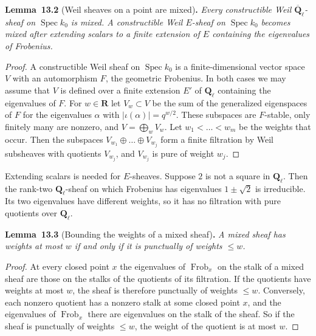 \documentclass[11pt]{article}
\newenvironment{bpstatement}[2]{\par\addvspace{0.6\baselineskip}\noindent\textbf{#1}#2\textbf{.}\enspace\ignorespaces}
  {\par\addvspace{0.4\baselineskip}}
\newenvironment{bpstatementit}[2]{\begin{bpstatement}{#1}{#2}\itshape\ignorespaces}{\end{bpstatement}}
\begin{document}
\label{bp9}%
\begin{bpstatementit}{Lemma~13.2}{ (Weil sheaves on a point are mixed)}
Every constructible Weil \(\overline{\mathbf Q}_\ell\)-sheaf on \(\operatorname{Spec}k_0\) is mixed. A constructible Weil \(E\)-sheaf on \(\operatorname{Spec}k_0\) becomes mixed after extending scalars to a finite extension of \(E\) containing the eigenvalues of Frobenius.
\end{bpstatementit}

\begin{proof}[{Proof}]\label{bp10}%
A constructible Weil sheaf on \(\operatorname{Spec}k_0\) is a finite-dimensional vector space \(V\) with an automorphism \(F\), the geometric Frobenius. In both cases we may assume that \(V\) is defined over a finite extension \(E'\) of \(\mathbf Q_\ell\) containing the eigenvalues of \(F\). For \(w\in\mathbf R\) let \(V_w\subset V\) be the sum of the generalized eigenspaces of \(F\) for the eigenvalues \(\alpha\) with \(|\iota(\alpha)|=q^{w/2}\). These subspaces are \(F\)-stable, only finitely many are nonzero, and \(V=\bigoplus_wV_w\). Let \(w_1<\dots<w_m\) be the weights that occur. Then the subspaces \(V_{w_1}\oplus\dots\oplus V_{w_j}\) form a finite filtration by Weil subsheaves with quotients \(V_{w_j}\), and \(V_{w_j}\) is pure of weight \(w_j\).
\end{proof}

\label{bp11}%
Extending scalars is needed for \(E\)-sheaves. Suppose \(2\) is not a square in \(\mathbf Q_\ell\). Then the rank-two \(\mathbf Q_\ell\)-sheaf on which Frobenius has eigenvalues \(1\pm\sqrt2\) is irreducible. Its two eigenvalues have different weights, so it has no filtration with pure quotients over \(\mathbf Q_\ell\).

\label{bp12}%
\begin{bpstatementit}{Lemma~13.3}{ (Bounding the weights of a mixed sheaf)}
A mixed sheaf has weights at most \(w\) if and only if it is punctually of weights \(\le w\).
\end{bpstatementit}

\begin{proof}[{Proof}]\label{bp13}%
At every closed point \(x\) the eigenvalues of \(\operatorname{Frob}_x\) on the stalk of a mixed sheaf are those on the stalks of the quotients of its filtration. If the quotients have weights at most \(w\), the sheaf is therefore punctually of weights \(\le w\). Conversely, each nonzero quotient has a nonzero stalk at some closed point \(x\), and the eigenvalues of \(\operatorname{Frob}_x\) there are eigenvalues on the stalk of the sheaf. So if the sheaf is punctually of weights \(\le w\), the weight of the quotient is at most \(w\).
\end{proof}
\end{document}
